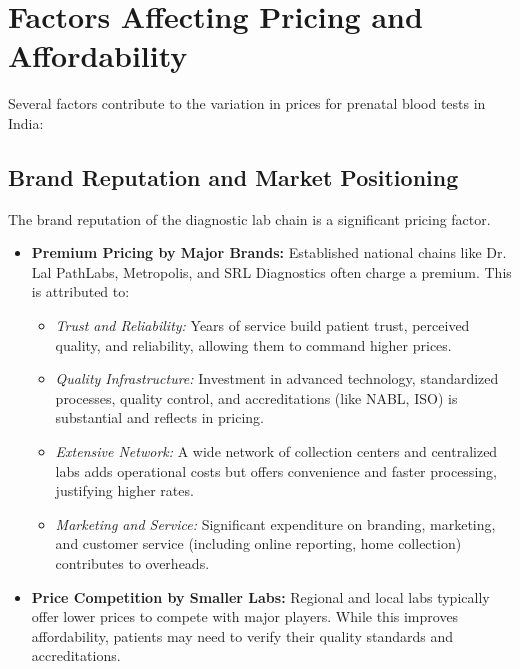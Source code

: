 \documentclass{article}
\begin{document}
\section{Factors Affecting Pricing and Affordability}

Several factors contribute to the variation in prices for prenatal blood tests in India:

\subsection{Brand Reputation and Market Positioning}
The brand reputation of the diagnostic lab chain is a significant pricing factor.
\begin{itemize}
    \item \textbf{Premium Pricing by Major Brands:} Established national chains like Dr. Lal PathLabs, Metropolis, and SRL Diagnostics often charge a premium. This is attributed to:
    \begin{itemize}
        \item \textit{Trust and Reliability:} Years of service build patient trust, perceived quality, and reliability, allowing them to command higher prices.
        \item \textit{Quality Infrastructure:} Investment in advanced technology, standardized processes, quality control, and accreditations (like NABL, ISO) is substantial and reflects in pricing.
        \item \textit{Extensive Network:} A wide network of collection centers and centralized labs adds operational costs but offers convenience and faster processing, justifying higher rates.
        \item \textit{Marketing and Service:} Significant expenditure on branding, marketing, and customer service (including online reporting, home collection) contributes to overheads.
    \end{itemize}
    \item \textbf{Price Competition by Smaller Labs:} Regional and local labs typically offer lower prices to compete with major players. While this improves affordability, patients may need to verify their quality standards and accreditations.
\end{itemize}
\end{document}
